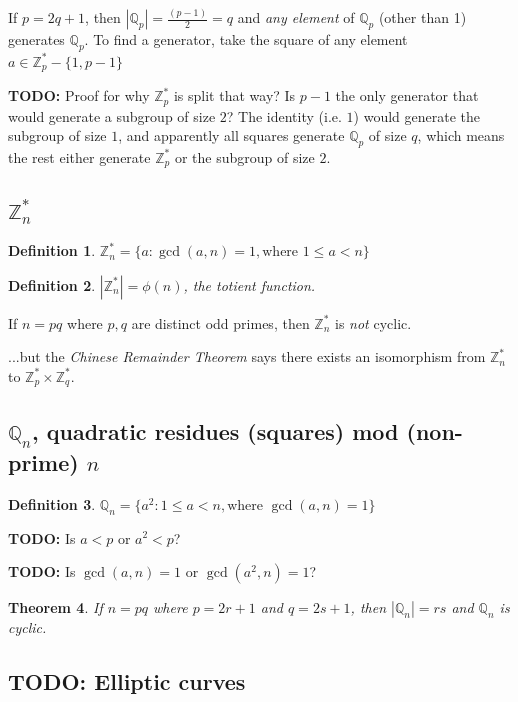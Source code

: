 \documentclass[12pt]{article}
\newtheorem{thm}{Theorem}[section]
\newtheorem{definition}[thm]{Definition}
\newcommand{\Zp}{\mathbb{Z}^{\ast}_p}
\newcommand{\Zq}{\mathbb{Z}^{\ast}_q}
\newcommand{\Zn}{\mathbb{Z}^{\ast}_n}
\newcommand{\Qp}{\mathbb{Q}_p}
\newcommand{\Qn}{\mathbb{Q}_n}
\newcommand{\todo}{\textbf{TODO:} }
\newcommand{\sz}[1]{\left|#1\right|}
\begin{document}
If $p = 2q + 1$, then $\sz{\Qp} = \frac{(p-1)}{2} = q$ and \emph{any element} of
$\Qp$ (other than 1) generates $\Qp$. To find a generator, take the square of
any element $a \in \Zp - \{1, p-1\}$

\todo Proof for why $\Zp$ is split that way? Is $p-1$ the only generator
that would generate a subgroup of size $2$? The identity (i.e. $1$) would generate
the subgroup of size $1$, and apparently all squares generate $\Qp$ of size $q$,
which means the rest either generate $\Zp$ or the subgroup of size $2$.

\subsection{$\Zn$}

\begin{definition}
$\Zn = \{a : \gcd(a, n) = 1, \text{where } 1 \le a < n\}$
\end{definition}

\begin{definition}
$\sz{\Zn} = \phi(n)$, the \emph{totient} function.
\end{definition}

If $n = pq$ where $p,q$ are distinct odd primes, then $\Zn$ is \emph{not} cyclic.

...but the \emph{Chinese Remainder Theorem} says there exists an isomorphism
from $\Zn$ to $\Zp \times \Zq$.

\subsection{$\Qn$, quadratic residues (squares) mod (non-prime) $n$}
\begin{definition}
$\Qn = \{a^2 : 1 \le a < n, \text{where } \gcd(a, n) = 1\}$
\end{definition}

\todo Is $a < p$ or $a^2 < p$?

\todo Is $\gcd(a, n) = 1$ or $\gcd(a^2, n) = 1$?

\begin{thm}
If $n = pq$ where $p = 2r+1$ and $q = 2s+1$, then $\sz{\Qn} = rs$ and
$\Qn$ is cyclic.
\end{thm}

\subsection{TODO: Elliptic curves}

\nocite{*}
\printbibliography
\end{document}

